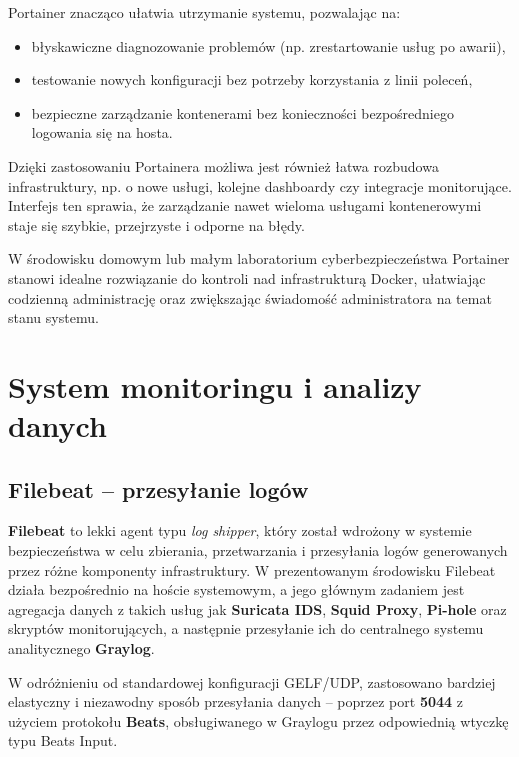 \documentclass[
    left=2.5cm,         %
    right=2.5cm,        %
    top=2.5cm,          %
    bottom=3cm,         %
    bindingoffset=6mm,  %
    nohyphenation=true %
]{eiti/eiti-thesis} %
\begin{document}
Portainer znacząco ułatwia utrzymanie systemu, pozwalając na:
\begin{itemize}
    \item błyskawiczne diagnozowanie problemów (np. zrestartowanie usług po awarii),
    \item testowanie nowych konfiguracji bez potrzeby korzystania z linii poleceń,
    \item bezpieczne zarządzanie kontenerami bez konieczności bezpośredniego logowania się na hosta.
\end{itemize}

Dzięki zastosowaniu Portainera możliwa jest również łatwa rozbudowa infrastruktury, np. o nowe usługi, kolejne dashboardy czy integracje monitorujące. Interfejs ten sprawia, że zarządzanie nawet wieloma usługami kontenerowymi staje się szybkie, przejrzyste i odporne na błędy.

W środowisku domowym lub małym laboratorium cyberbezpieczeństwa Portainer stanowi idealne rozwiązanie do kontroli nad infrastrukturą Docker, ułatwiając codzienną administrację oraz zwiększając świadomość administratora na temat stanu systemu.


\newpage 
\section{System monitoringu i analizy danych}

\subsection{Filebeat – przesyłanie logów}

\textbf{Filebeat}\cite{filebeat-docs} to lekki agent typu \textit{log shipper}, który został wdrożony w systemie bezpieczeństwa w celu zbierania, przetwarzania i przesyłania logów generowanych przez różne komponenty infrastruktury. W prezentowanym środowisku Filebeat działa bezpośrednio na hoście systemowym\cite{config-filebeat}, a jego głównym zadaniem jest agregacja danych z takich usług jak \textbf{Suricata IDS}, \textbf{Squid Proxy}, \textbf{Pi-hole} oraz skryptów monitorujących, a następnie przesyłanie ich do centralnego systemu analitycznego \textbf{Graylog}.

W odróżnieniu od standardowej konfiguracji GELF/UDP, zastosowano bardziej elastyczny i niezawodny sposób przesyłania danych – poprzez port \textbf{5044} z użyciem protokołu \textbf{Beats}, obsługiwanego w Graylogu przez odpowiednią wtyczkę typu Beats Input.
\end{document}

